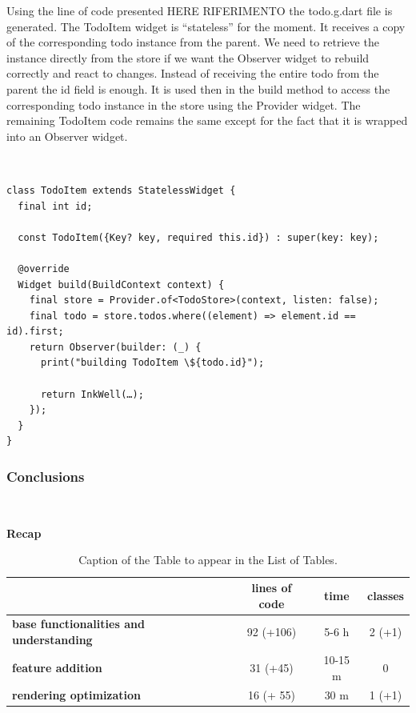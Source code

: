 Using the line of code presented HERE RIFERIMENTO the todo.g.dart file is generated. The TodoItem widget is “stateless” for the moment. It receives a copy of the corresponding todo instance from the parent. We need to retrieve the instance directly from the store if we want the Observer widget to rebuild correctly and react to changes. Instead of receiving the entire todo from the parent the id field is enough. It is used then in the build method to access the corresponding todo instance in the store using the Provider widget. The remaining TodoItem code remains the same except for the fact that it is wrapped into an Observer widget.
\begin{code}
\mbox{}\\
 \mbox{}
		\label{code:2.14}
\begin{verbatim}
class TodoItem extends StatelessWidget {
  final int id;

  const TodoItem({Key? key, required this.id}) : super(key: key);

  @override
  Widget build(BuildContext context) {
    final store = Provider.of<TodoStore>(context, listen: false);
    final todo = store.todos.where((element) => element.id == id).first;
    return Observer(builder: (_) {
      print("building TodoItem \${todo.id}");

      return InkWell(…);
    });
  }
}
\end{verbatim}
\mbox{}
\end{code}

\subsubsection{Conclusions} \mbox{}\\ \label{par:todo_app_inherited_widget_introduction}
\begin{table}[H]
    \caption*{\textbf{Recap}}
    \centering 
       \begin{tabular}{| l | c | c | c |}
    \hline
    \rowcolor{bluepoli!40} %
    \hline
     & \textbf{lines of code} & \textbf{time} & \textbf{classes} \T\B \\
     \hline
    \textbf{base functionalities and understanding} & 92 (+106) & 5-6 h & 2 (+1) \T\B \\ 
    \textbf{feature addition} & 31 (+45) & 10-15 m & 0 \T\B\\ 
    \textbf{rendering optimization} & 16 (+ 55) & 30 m & 1 (+1) \B\\
    \hline
    \end{tabular}
    \\[10pt]
    \caption{Caption of the Table to appear in the List of Tables.}
    \label{table:example}
\end{table}

